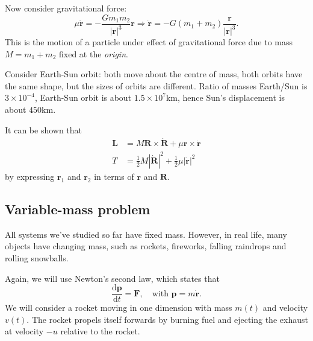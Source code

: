Now consider gravitational force: 
\[
    \mu \ddot{\mathbf{r}} = -\frac{Gm_1m_2}{|\mathbf{r}|^3}\mathbf{r} \Longrightarrow \ddot{\mathbf{r}} = -G(m_1+m_2)\frac{\mathbf{r}}{|\mathbf{r}|^3}.
\]
This is the motion of a particle under effect of gravitational force due to mass $ M=m_1+m_2 $ fixed at the \textit{origin}.

Consider Earth-Sun orbit: both move about the centre of mass, both orbits have the same shape, but the sizes of orbits are different. Ratio of masses Earth/Sun is $ 3\times 10^{-4} $, Earth-Sun orbit is about $ 1.5\times 10^7 \mathrm{km} $, hence Sun's displacement is about $ 450\mathrm{km} $.

It can be shown that
\begin{align*}
  \mathbf{L} &= M\mathbf{R} \times \dot{\mathbf{R}} + \mu \mathbf{r}\times \dot{\mathbf{r}}\\
  T &= \frac{1}{2} M|\dot{\mathbf{R}}|^2 + \frac{1}{2}\mu |\dot{\mathbf{r}}|^2
\end{align*}
by expressing $\mathbf{r}_1$ and $\mathbf{r}_2$ in terms of $\mathbf{r}$ and $\mathbf{R}$.

\subsection{Variable-mass problem}
All systems we've studied so far have fixed mass. However, in real life, many objects have changing mass, such as rockets, fireworks, falling raindrops and rolling snowballs.

Again, we will use Newton's second law, which states that
\[
  \frac{\mathrm{d} \mathbf{p}}{\mathrm{d} t} = \mathbf{F},\quad\text{with }\mathbf{p} = m\dot{\mathbf{r}}.
\]
We will consider a rocket moving in one dimension with mass $m(t)$ and velocity $v(t)$. The rocket propels itself forwards by burning fuel and ejecting the exhaust at velocity $-u$ relative to the rocket.

